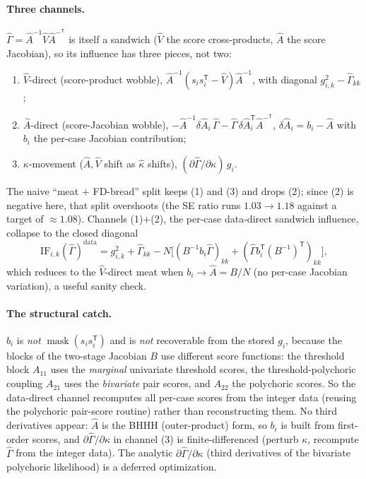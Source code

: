 \documentclass[11pt]{article}
\newcommand{\T}{^{\mathsf T}}
\begin{document}
\paragraph{Three channels.} $\hat\Gamma=\hat A^{-1}\hat V\hat A^{-\T}$ is itself a
sandwich ($\hat V$ the score cross-products, $\hat A$ the score Jacobian), so its
influence has three pieces, not two:
\begin{enumerate}\itemsep0pt
\item $\hat V$-direct (score-product wobble),
  $\hat A^{-1}(s_is_i\T-\hat V)\hat A^{-1}$, with diagonal $g_{i,k}^2-\hat\Gamma_{kk}$;
\item $\hat A$-direct (score-Jacobian wobble),
  $-\hat A^{-1}\delta\hat A_i\,\hat\Gamma-\hat\Gamma\,\delta\hat A_i\T\hat A^{-\T}$,
  $\delta\hat A_i=b_i-\hat A$ with $b_i$ the per-case Jacobian contribution;
\item $\kappa$-movement ($\hat A,\hat V$ shift as $\hat\kappa$ shifts),
  $(\partial\hat\Gamma/\partial\kappa)\,g_i$.
\end{enumerate}
The naive ``meat $+$ FD-bread'' split keeps (1) and (3) and drops (2); since (2)
is negative here, that split overshoots (the SE ratio runs $1.03\!\to\!1.18$
against a target of $\approx1.08$). Channels (1)$+$(2), the per-case data-direct
sandwich influence, collapse to the closed diagonal
\[
  \mathrm{IF}_{i,k}(\hat\Gamma)^{\mathrm{data}}
  = g_{i,k}^2 + \hat\Gamma_{kk}
    - N\big[(B^{-1} b_i\hat\Gamma)_{kk}
      + (\hat\Gamma b_i\T (B^{-1})\T)_{kk}\big],
\]
which reduces to the $\hat V$-direct meat when $b_i\to\hat A=B/N$ (no per-case
Jacobian variation), a useful sanity check.

\paragraph{The structural catch.} $b_i$ is \emph{not} $\operatorname{mask}(s_is_i\T)$
and is \emph{not} recoverable from the stored $g_i$, because the blocks of the
two-stage Jacobian $B$ use different score functions: the threshold block
$A_{11}$ uses the \emph{marginal} univariate threshold scores, the
threshold-polychoric coupling $A_{21}$ uses the \emph{bivariate} pair scores, and
$A_{22}$ the polychoric scores. So the data-direct channel recomputes all
per-case scores from the integer data (reusing the polychoric pair-score routine)
rather than reconstructing them. No third derivatives appear: $\hat A$ is the BHHH
(outer-product) form, so $b_i$ is built from first-order scores, and
$\partial\hat\Gamma/\partial\kappa$ in channel (3) is finite-differenced (perturb
$\kappa$, recompute $\hat\Gamma$ from the integer data). The analytic
$\partial\hat\Gamma/\partial\kappa$ (third derivatives of the bivariate
polychoric likelihood) is a deferred optimization.
\end{document}
